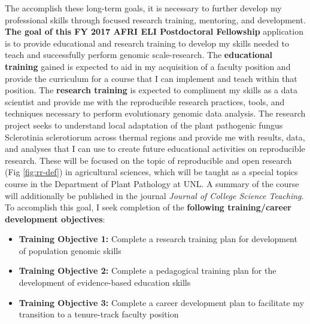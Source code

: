 \documentclass[12pt,letterpaper]{article}
\begin{document}
The accomplish these long-term goals, it is necessary to further develop my professional skills through focused research training, mentoring, and development. 
\textbf{The goal of this FY 2017 AFRI ELI Postdoctoral Fellowship} application is to provide educational and research training to develop my skills needed to teach and successfully perform genomic scale-research. 
The \textbf{educational training} gained is expected to aid in my acquisition of a faculty position and provide the curriculum for a course that I can implement and teach within that position. 
The \textbf{research training} is expected to compliment my skills as a data scientist and provide me with the reproducible research practices, tools, and techniques necessary to perform evolutionary genomic data analysis. 
The research project seeks to understand local adaptation of the plant pathogenic fungus Sclerotinia sclerotiorum across thermal regions and provide me with results, data, and analyses that I can use to create future educational activities on reproducible research. 
These will be focused on the topic of reproducible and open research (Fig \ref{fig:rr-def}) in agricultural sciences, which will be taught as a special topics course in the Department of Plant Pathology at UNL. 
A summary of the course will additionally be published in the journal \textit{Journal of College Science Teaching}. 
To accomplish this goal, I seek completion of the \textbf{following training/career development objectives}:
\begin{itemize}
  \item \textbf{Training Objective 1:} Complete a research training plan for development of population genomic skills
  \item \textbf{Training Objective 2:} Complete a pedagogical training plan for the development of evidence-based education skills
  \item \textbf{Training Objective 3:} Complete a career development plan to facilitate my transition to a tenure-track faculty position
\end{itemize}


\end{document}
